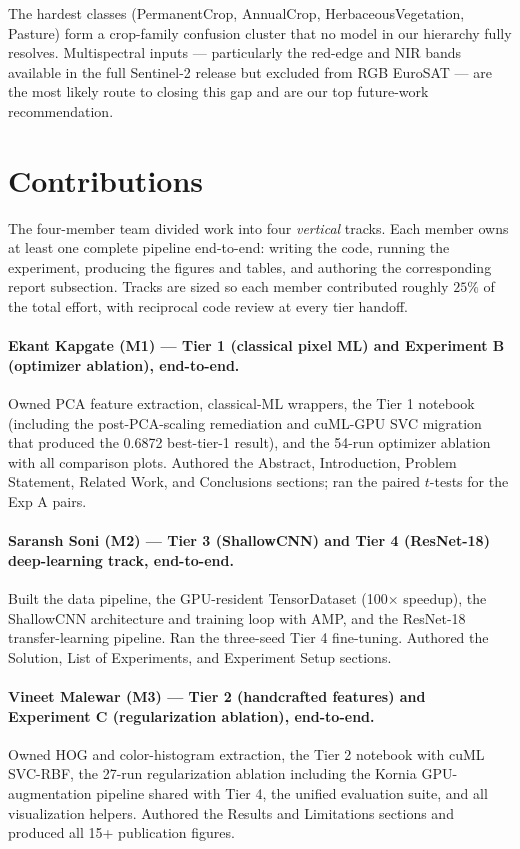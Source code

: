 \documentclass[10pt,letterpaper]{article}
\begin{document}
The hardest classes (PermanentCrop, AnnualCrop, HerbaceousVegetation, Pasture) form a crop-family confusion cluster that no model in our hierarchy fully resolves. Multispectral inputs --- particularly the red-edge and NIR bands available in the full Sentinel-2 release but excluded from RGB EuroSAT --- are the most likely route to closing this gap and are our top future-work recommendation.

\section{Contributions}
\label{sec:contributions}
The four-member team divided work into four \emph{vertical} tracks. Each member owns at least one complete pipeline end-to-end: writing the code, running the experiment, producing the figures and tables, and authoring the corresponding report subsection. Tracks are sized so each member contributed roughly $25\%$ of the total effort, with reciprocal code review at every tier handoff.

\paragraph{Ekant Kapgate (M1) --- Tier 1 (classical pixel ML) and Experiment B (optimizer ablation), end-to-end.} Owned PCA feature extraction, classical-ML wrappers, the Tier 1 notebook (including the post-PCA-scaling remediation and cuML-GPU SVC migration that produced the 0.6872 best-tier-1 result), and the 54-run optimizer ablation with all comparison plots. Authored the Abstract, Introduction, Problem Statement, Related Work, and Conclusions sections; ran the paired $t$-tests for the Exp A pairs.

\paragraph{Saransh Soni (M2) --- Tier 3 (ShallowCNN) and Tier 4 (ResNet-18) deep-learning track, end-to-end.} Built the data pipeline, the GPU-resident TensorDataset (100$\times$ speedup), the ShallowCNN architecture and training loop with AMP, and the ResNet-18 transfer-learning pipeline. Ran the three-seed Tier 4 fine-tuning. Authored the Solution, List of Experiments, and Experiment Setup sections.

\paragraph{Vineet Malewar (M3) --- Tier 2 (handcrafted features) and Experiment C (regularization ablation), end-to-end.} Owned HOG and color-histogram extraction, the Tier 2 notebook with cuML SVC-RBF, the 27-run regularization ablation including the Kornia GPU-augmentation pipeline shared with Tier 4, the unified evaluation suite, and all visualization helpers. Authored the Results and Limitations sections and produced all 15+ publication figures.
\end{document}
